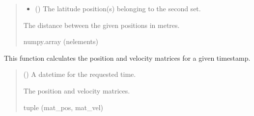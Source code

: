\documentclass[letterpaper,10pt,english]{sphinxmanual}
\begin{document}
\begin{fulllineitems}
\begin{quote}
\begin{description}
\begin{itemize}
\item {} 
\sphinxAtStartPar
{} (\sphinxstyleliteralemphasis{\sphinxupquote{ (}}\sphinxstyleliteralemphasis{\sphinxupquote{)}}) \textendash{} The latitude position(s) belonging to the second set.

\end{itemize}

\sphinxAtStartPar
The distance between the given positions in metres.

\sphinxAtStartPar
numpy.array (n\sphinxhyphen{}elements)

\end{description}\end{quote}

\end{fulllineitems}


\begin{fulllineitems}
\label{\detokenize{modules/util/transformations:qnav.util.transformations.get_time_pos_vel}}
\pysigstartsignatures
{}
\pysigstopsignatures
\sphinxAtStartPar
This function calculates the position and velocity matrices for a given
timestamp.
\begin{quote}\begin{description}
\sphinxAtStartPar
{} () \textendash{} A datetime for the requested time.

\sphinxAtStartPar
The position and velocity matrices.

\sphinxAtStartPar
tuple (mat\_pos, mat\_vel)

\end{description}\end{quote}

\end{fulllineitems}
\end{document}
